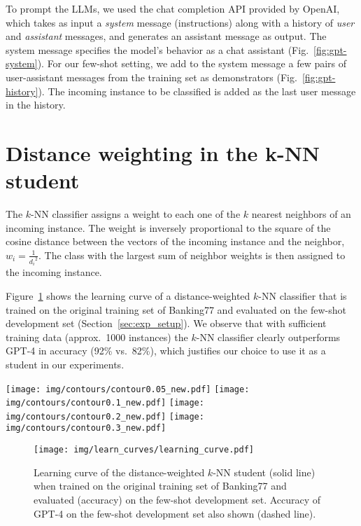 \documentclass[11pt]{article}
\begin{document}
To prompt the LLMs, we used the chat completion API provided by OpenAI, which takes as input a \emph{system} message (instructions) along with a history of \emph{user} and \emph{assistant} messages, and generates an assistant message as output. The system message specifies the model's behavior as a chat assistant (Fig.~\ref{fig:gpt-system}). For our few-shot setting, we add to the system message a few pairs of user-assistant messages from the training set as demonstrators (Fig.~\ref{fig:gpt-history}). The incoming instance to be classified is added as the last user message in the history.

\section{Distance weighting in the k-NN student}
\label{sec:knn_details}
\label{sec:learning_curves}

The $k$-NN classifier assigns a weight to each one of the $k$ nearest neighbors of an incoming instance. The weight is inversely proportional to the square of the cosine distance between the vectors of the incoming instance and the neighbor,  $w_i = \frac{1}{{d_i}^2}$. The class with the largest sum of neighbor weights is then assigned to the incoming instance. 

Figure~\ref{fig:lrc} shows the learning curve of a distance-weighted $k$-NN classifier that is trained on the original training set of Banking77  and evaluated on the few-shot development set (Section~\ref{sec:exp_setup}). We observe that with sufficient training data (approx.\ 1000 instances) the $k$-NN classifier clearly outperforms GPT-4 in accuracy (92\% vs.\ 82\%), which justifies our choice to use it as a student in our experiments. 

\begin{figure*}[tb]
\centering 
    \texttt{[image: img/contours/contour0.05\_new.pdf]}
    \texttt{[image: img/contours/contour0.1\_new.pdf]}
    \texttt{[image: img/contours/contour0.2\_new.pdf]}
    \texttt{[image: img/contours/contour0.3\_new.pdf]}
    \vspace{-2mm}    
    \caption{Contour plots (discounted accuracy) obtained during threshold tuning in the main experiments (GPT-4 teacher, $k$-NN student, Banking 77 data), for various $\lambda$ values.}
    \label{fig:contours}
\end{figure*}


\begin{figure}[ht]
    \centering
    \vspace{-1pt} 
    
    \texttt{[image: img/learn\_curves/learning\_curve.pdf]}
    \caption{Learning curve of the distance-weighted $k$-NN student (solid line) when trained on the original training set of Banking77 and evaluated (accuracy) on the few-shot development set. Accuracy of GPT-4 on the few-shot development set also shown (dashed line).}
    \label{fig:lrc}
    \vspace{-1em}
\end{figure}
\end{document}

